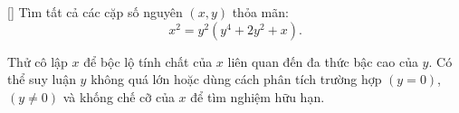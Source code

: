 \documentclass[../04-diophantine-equations.tex]{subfiles}
\begin{document}
\begin{exercise*}\label{example:FRA-2015-TST3-P6}[\textbf{}]
    Tìm tất cả các cặp số nguyên \( (x, y) \) thỏa mãn:
    \[
        x^2 = y^2(y^4 + 2y^2 + x).
    \]
\end{exercise*}

\begin{remark*}
    Thử cô lập \(x\) để bộc lộ tính chất của \(x\) liên quan đến đa thức bậc cao của \(y\).  
    Có thể suy luận \(y\) không quá lớn hoặc dùng cách phân tích trường hợp \((y = 0)\), \((y \neq 0)\) và khống chế cỡ của \(x\) để tìm nghiệm hữu hạn.
\end{remark*}
\end{document}
